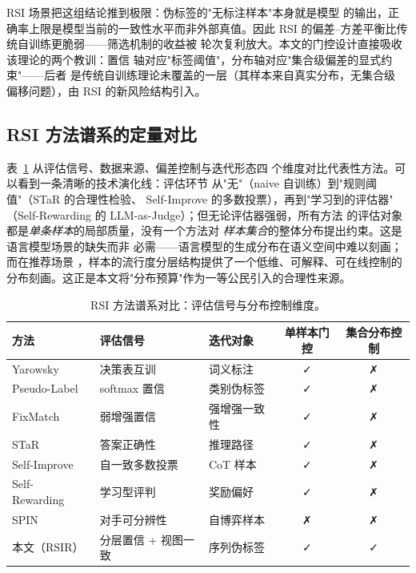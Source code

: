 RSI 场景把这组结论推到极限：伪标签的"无标注样本"本身就是模型
的输出，正确率上限是模型当前的一致性水平而非外部真值。因此
RSI 的偏差--方差平衡比传统自训练更脆弱——筛选机制的收益被
轮次复利放大。本文的门控设计直接吸收该理论的两个教训：置信
轴对应"标签阈值"，分布轴对应"集合级偏差的显式约束"——后者
是传统自训练理论未覆盖的一层（其样本来自真实分布，无集合级
偏移问题），由 RSI 的新风险结构引入。

\subsection{RSI 方法谱系的定量对比}
表~\ref{tab:rsimap} 从评估信号、数据来源、偏差控制与迭代形态四
个维度对比代表性方法。可以看到一条清晰的技术演化线：评估环节
从"无"（naive 自训练）到"规则阈值"（STaR 的合理性检验、
Self-Improve 的多数投票），再到"学习到的评估器"
（Self-Rewarding 的 LLM-as-Judge）；但无论评估器强弱，所有方法
的评估对象都是\emph{单条样本}的局部质量，没有一个方法对
\emph{样本集合}的整体分布提出约束。这是语言模型场景的缺失而非
必需——语言模型的生成分布在语义空间中难以刻画；而在推荐场景
，样本的流行度分层结构提供了一个低维、可解释、可在线控制的
分布刻画。这正是本文将"分布预算"作为一等公民引入的合理性来源。

\begin{table}[t]
\centering
\caption{RSI 方法谱系对比：评估信号与分布控制维度。}
\label{tab:rsimap}
\begin{tabular}{lp{34mm}p{30mm}cc}
\toprule
方法 & 评估信号 & 迭代对象 & 单样本门控 & 集合分布控制 \\
\midrule
Yarowsky~\cite{yarowsky1995wsd} & 决策表互训 & 词义标注 & ✓ & ✗ \\
Pseudo-Label~\cite{lee2013pseudo} & softmax 置信 & 类别伪标签 & ✓ & ✗ \\
FixMatch~\cite{sohn2020fixmatch} & 弱增强置信 & 强增强一致性 & ✓ & ✗ \\
STaR~\cite{zelikman2022star} & 答案正确性 & 推理路径 & ✓ & ✗ \\
Self-Improve~\cite{huang2023selfimprove} & 自一致多数投票 & CoT 样本 & ✓ & ✗ \\
Self-Rewarding~\cite{yuan2024selfrewarding} & 学习型评判 & 奖励偏好 & ✓ & ✗ \\
SPIN~\cite{chen2024spin} & 对手可分辨性 & 自博弈样本 & ✗ & ✗ \\
\midrule
本文（RSIR） & 分层置信 + 视图一致 & 序列伪标签 & ✓ & ✓ \\
\bottomrule
\end{tabular}
\end{table}

